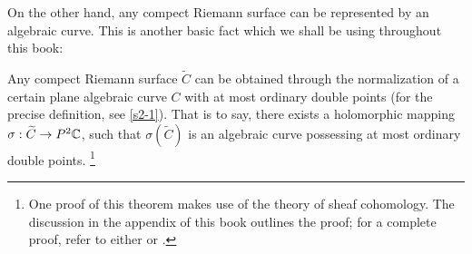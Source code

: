 On the other hand, any compect Riemann surface can be represented by an algebraic curve. This is another basic fact which we shall be using throughout this book: 
\begin{theorem}
    Any compect Riemann surface $\widetilde{C}$ can be obtained through the normalization of a certain plane algebraic curve $C$ with at most ordinary double points (for the precise definition, see \autoref{s2-1}). That is to say, there exists a holomorphic mapping $\sigma:\widetilde{C}\to P^2\mathbb{C}$, such that $\sigma(\widetilde{C})$ is an algebraic curve possessing at most ordinary double points. \footnote{One proof of this theorem makes use of the theory of sheaf cohomology. The discussion in the appendix of this book outlines the proof; for a complete proof, refer to either \cite[chapter 2]{MR1288523} or \cite[section 5.21]{MR703513}.}
\end{theorem}

